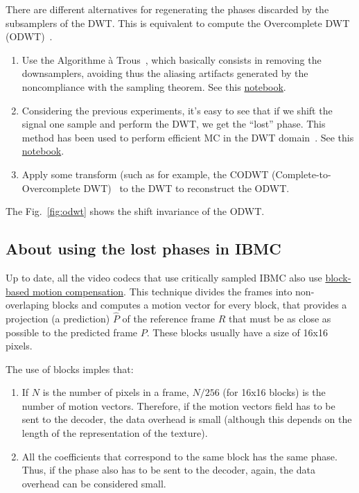 There are different alternatives for regenerating the phases discarded
by the subsamplers of the DWT. This is equivalent to compute the
Overcomplete DWT (ODWT)~\cite{mallat1999wavelet}.
\begin{enumerate}
\item Use the Algorithme \`a Trous~\cite{mallat1999wavelet}, which
  basically consists in removing the downsamplers, avoiding thus the
  aliasing artifacts generated by the noncompliance with the sampling
  theorem. See this
  \href{https://github.com/Sistemas-Multimedia/Sistemas-Multimedia.github.io/blob/master/milestones/11-MC_in_DWT_domain/regenerating.ipynb}{notebook}.
\item Considering the previous experiments, it's easy to see that if
  we shift the signal one sample and perform the DWT, we get the
  ``lost'' phase. This method has been used to perform efficient MC in
  the DWT domain~\cite{park2000motion,li2001all}. See this
  \href{https://github.com/Sistemas-Multimedia/Sistemas-Multimedia.github.io/blob/master/milestones/11-MC_in_DWT_domain/ODWT_with_delay.ipynb}{notebook}.
\item Apply some transform (such as for example, the CODWT
  (Complete-to-Overcomplete DWT)~\cite{andreopoulos2005complete} to
  the DWT to reconstruct the ODWT.
\end{enumerate}
The Fig.~\ref{fig:odwt} shows the shift invariance of the ODWT.

\subsection{About using the lost phases in IBMC}
Up to date, all the video codecs that use critically sampled IBMC also
use
\href{https://vicente-gonzalez-ruiz.github.io/video_compression/}{block-based
  motion compensation}. This technique divides the frames into
non-overlaping blocks and computes a motion vector for every block,
that provides a projection (a prediction) $\hat{P}$ of the reference
frame $R$ that must be as close as possible to the predicted frame
$P$. These blocks usually have a size of 16x16 pixels.

The use of blocks imples that:
\begin{enumerate}
\item If $N$ is the number of pixels in a frame, $N/256$ (for 16x16
  blocks) is the number of motion vectors. Therefore, if the motion
  vectors field has to be sent to the decoder, the data overhead is
  small (although this depends on the length of the representation of
  the texture).
\item All the coefficients that correspond to the same block has the
  same phase. Thus, if the phase also has to be sent to the decoder,
  again, the data overhead can be considered small.
\end{enumerate}

